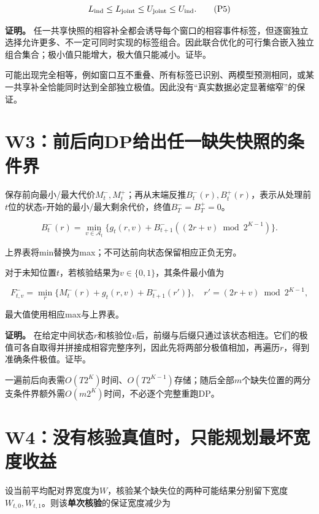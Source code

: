 \documentclass[UTF8,11pt,a4paper,fontset=windows]{ctexart}
\begin{document}
\begin{equation}
L_{\rm ind}\le L_{\rm joint}\le U_{\rm joint}\le U_{\rm ind}.\tag{P5}
\end{equation}

\textbf{证明。} 任一共享快照的相容补全都会诱导每个窗口的相容事件标签，但逐窗独立选择允许更多、不一定可同时实现的标签组合。因此联合优化的可行集合嵌入独立组合集合；极小值只能增大，极大值只能减小。证毕。


可能出现完全相等，例如窗口互不重叠、所有标签已识别、两模型预测相同，或某一共享补全恰能同时达到全部独立极值。因此没有“真实数据必定显著缩窄”的保证。


\section{W3：前后向DP给出任一缺失快照的条件界}

保存前向最小/最大代价$M_t^-,M_t^+$；再从末端反推$B_t^-(r),B_t^+(r)$，表示从处理前$t$位的状态$r$开始的最小/最大剩余代价，终值$B_T^-=B_T^+=0$。


\begin{equation}
B_t^-(r)=\min_{v\in\mathcal A_t}\{g_t(r,v)+B_{t+1}^-((2r+v)\bmod 2^{K-1})\}.\tag{P6a}
\end{equation}

上界表将min替换为max；不可达前向状态保留相应正负无穷。


对于未知位置$t$，若核验结果为$v\in\{0,1\}$，其条件最小值为


\begin{equation}
F_{t,v}^-=\min_r\{M_t^-(r)+g_t(r,v)+B_{t+1}^-(r')\},\quad r'=(2r+v)\bmod2^{K-1},\tag{P6}
\end{equation}

最大值使用相应max与上界表。


\textbf{证明。} 在给定中间状态$r$和核验位$v$后，前缀与后缀只通过该状态相连。它们的极值可各自取得并拼接成相容完整序列，因此先将两部分极值相加，再遍历$r$，得到准确条件极值。证毕。


一遍前后向表需$O(T2^K)$时间、$O(T2^{K-1})$存储；随后全部$m$个缺失位置的两分支条件界额外需$O(m2^K)$时间，不必逐个完整重跑DP。


\section{W4：没有核验真值时，只能规划最坏宽度收益}

设当前平均配对界宽度为$W$，核验某个缺失位的两种可能结果分别留下宽度$W_{t,0},W_{t,1}$。则该\textbf{单次核验}的保证宽度减少为
\end{document}
